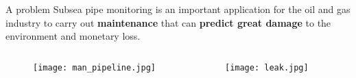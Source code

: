 \begin{frame}[t]{A problem} 
    \transdissolve[duration=0.5]
    Subsea pipe monitoring is an important application for the oil and gas industry to carry out \textbf{maintenance} that can \textbf{predict great damage} to the environment and monetary loss.

   
        \begin{columns}[t]
            
            \begin{center}
            \begin{figure}
                \texttt{[image: man\_pipeline.jpg]}
               
               
                  
               
            \end{figure}

            \end{center}
            \begin{center}
          
                \begin{figure}
                    
                    \texttt{[image: leak.jpg]}
                \end{figure}
            \end{center}
            
           
        \end{columns}
\end{frame}
